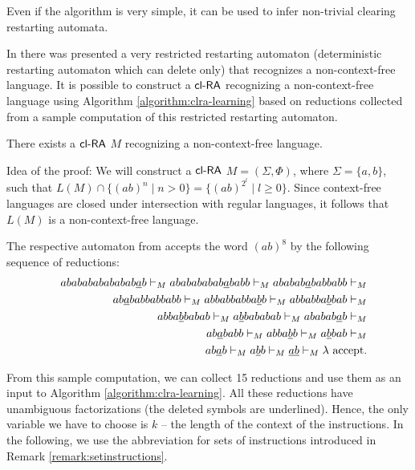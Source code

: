 Even if the algorithm is very simple, it can be used to infer non-trivial clearing restarting automata.

In \citep{JMPV97} there was presented a very restricted restarting automaton (deterministic restarting automaton which can delete only) that recognizes a non-context-free language. It is possible to construct a $\textup{\sf cl-RA\/}$ recognizing a non-context-free language using Algorithm \ref{algorithm:clra-learning} based on reductions collected from a sample computation of this restricted restarting automaton.

\begin{theorem}\label{theorem:clRAnonCFL}
There exists a $\textup{\sf cl-RA\/}$ $M$ recognizing a non-context-free language.
\end{theorem}

Idea of the proof: We will construct a $\textup{\sf cl-RA\/}$ $M = (\Sigma, \Phi)$, where $\Sigma = \{a, b\}$, such that $L(M) \cap \{(ab)^n \mid n>0\} = \{(ab)^{2^l} \mid l \ge 0\}$. Since context-free languages are closed under intersection with regular languages, it follows that $L(M)$ is a non-context-free language.

The respective automaton from \citep{JMPV97} accepts the word $(ab)^8$ by the following sequence of reductions:
\begin{eqnarray*}
& & ababababababab\underline{a}b  \vdash_M
ababababab\underline{a}babb  \vdash_M
  ababab\underline{a}babbabb  \vdash_M\\
& & ab\underline{a}babbabbabb  \vdash_M
  abbabbabba\underline{b}b  \vdash_M
  abbabba\underline{b}bab  \vdash_M\\
& & abba\underline{b}babab  \vdash_M
  a\underline{b}bababab  \vdash_M
  ababab\underline{a}b  \vdash_M\\
& & ab\underline{a}babb  \vdash_M
  abba\underline{b}b  \vdash_M
  a\underline{b}bab  \vdash_M\\
& & ab\underline{a}b  \vdash_M
  a\underline{b}b  \vdash_M
  \underline{ab}  \vdash_M
  \lambda  \textup{ accept}.
\end{eqnarray*}

From this sample computation, we can collect 15 reductions and use them as an input to Algorithm \ref{algorithm:clra-learning}. All these reductions have unambiguous factorizations (the deleted symbols are underlined). Hence, the only variable we have to choose is $k$ -- the length of the context of the instructions. In the following, we use the abbreviation for sets of instructions introduced in Remark \ref{remark:setinstructions}.

